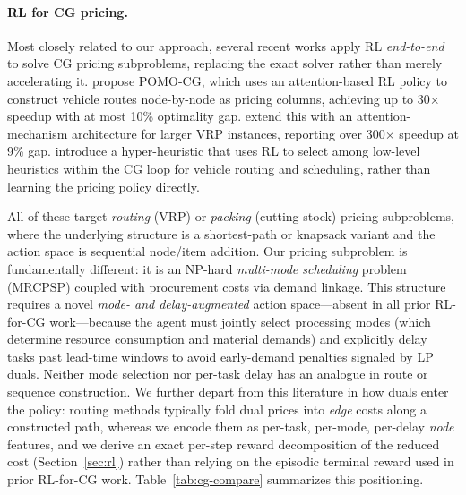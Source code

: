\documentclass[11pt]{article}
\begin{document}
\paragraph{RL for CG pricing.}
Most closely related to our approach, several recent works apply RL \emph{end-to-end} to solve CG pricing subproblems, replacing the exact solver rather than merely accelerating it.
\citet{pomocg2024} propose POMO-CG, which uses an attention-based RL policy to construct vehicle routes node-by-node as pricing columns, achieving up to 30$\times$ speedup with at most 10\% optimality gap.
\citet{hoornaert2025vrp} extend this with an attention-mechanism architecture for larger VRP instances, reporting over 300$\times$ speedup at 9\% gap.
\citet{rlhh2025cg} introduce a hyper-heuristic that uses RL to select among low-level heuristics within the CG loop for vehicle routing and scheduling, rather than learning the pricing policy directly.

All of these target \emph{routing} (VRP) or \emph{packing} (cutting stock) pricing subproblems, where the underlying structure is a shortest-path or knapsack variant and the action space is sequential node/item addition.
Our pricing subproblem is fundamentally different: it is an NP-hard \emph{multi-mode scheduling} problem (MRCPSP) coupled with procurement costs via demand linkage.
This structure requires a novel \emph{mode- and delay-augmented} action space---absent in all prior RL-for-CG work---because the agent must jointly select processing modes (which determine resource consumption and material demands) and explicitly delay tasks past lead-time windows to avoid early-demand penalties signaled by LP duals.
Neither mode selection nor per-task delay has an analogue in route or sequence construction.
We further depart from this literature in how duals enter the policy: routing methods typically fold dual prices into \emph{edge} costs along a constructed path, whereas we encode them as per-task, per-mode, per-delay \emph{node} features, and we derive an exact per-step reward decomposition of the reduced cost (Section~\ref{sec:rl}) rather than relying on the episodic terminal reward used in prior RL-for-CG work. Table~\ref{tab:cg-compare} summarizes this positioning.
\end{document}
